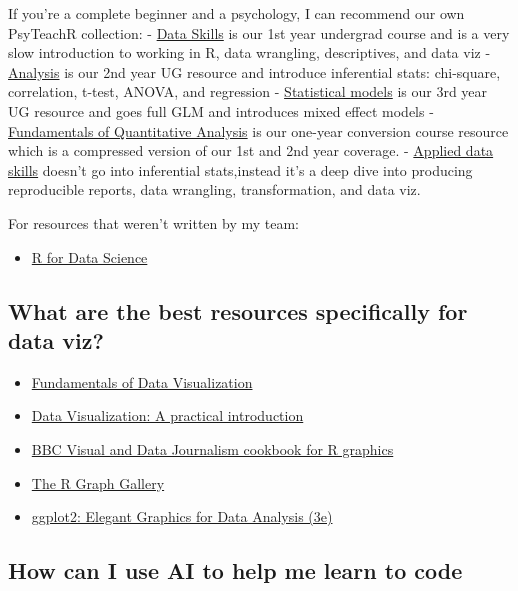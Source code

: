 \documentclass[
  oneside]{book}
\providecommand{\tightlist}{%
  \setlength{\itemsep}{0pt}\setlength{\parskip}{0pt}}
\begin{document}
If you're a complete beginner and a psychology, I can recommend our own PsyTeachR collection:
- \href{https://psyteachr.github.io/data-skills-v3/}{Data Skills} is our 1st year undergrad course and is a very slow introduction to working in R, data wrangling, descriptives, and data viz
- \href{https://psyteachr.github.io/analysis-v3/}{Analysis} is our 2nd year UG resource and introduce inferential stats: chi-square, correlation, t-test, ANOVA, and regression
- \href{https://psyteachr.github.io/stat-models-v1/}{Statistical models} is our 3rd year UG resource and goes full GLM and introduces mixed effect models
- \href{https://psyteachr.github.io/quant-fun-v3/}{Fundamentals of Quantitative Analysis} is our one-year conversion course resource which is a compressed version of our 1st and 2nd year coverage.
- \href{https://psyteachr.github.io/ads-v3/}{Applied data skills} doesn't go into inferential stats,instead it's a deep dive into producing reproducible reports, data wrangling, transformation, and data viz.

For resources that weren't written by my team:

\begin{itemize}
\tightlist
\item
  \href{https://r4ds.hadley.nz/}{R for Data Science}
\end{itemize}

\subsection{What are the best resources specifically for data viz?}\label{what-are-the-best-resources-specifically-for-data-viz}

\begin{itemize}
\tightlist
\item
  \href{https://clauswilke.com/dataviz/}{Fundamentals of Data Visualization}
\item
  \href{https://socviz.co/}{Data Visualization: A practical introduction}
\item
  \href{https://bbc.github.io/rcookbook/\#how_to_create_bbc_style_graphics}{BBC Visual and Data Journalism cookbook for R graphics}
\item
  \href{https://r-graph-gallery.com/}{The R Graph Gallery}
\item
  \href{https://ggplot2-book.org/}{ggplot2: Elegant Graphics for Data Analysis (3e)}
\end{itemize}

\subsection{How can I use AI to help me learn to code}\label{how-can-i-use-ai-to-help-me-learn-to-code}
\end{document}
